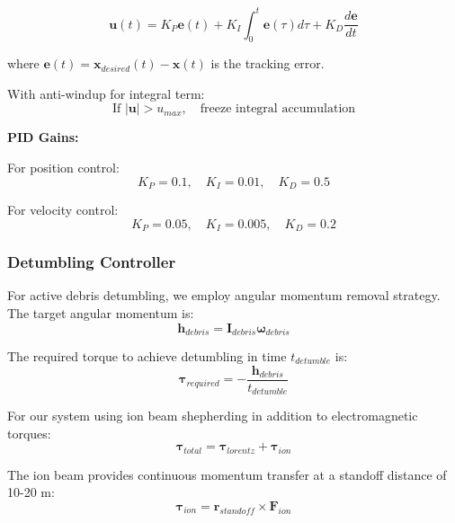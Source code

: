 \documentclass[12pt,a4paper]{article}
\begin{document}
\begin{equation}
\mathbf{u}(t) = K_P\mathbf{e}(t) + K_I\int_0^t\mathbf{e}(\tau)d\tau + K_D\frac{d\mathbf{e}}{dt}
\label{eq:pid}
\end{equation}

where $\mathbf{e}(t) = \mathbf{x}_{desired}(t) - \mathbf{x}(t)$ is the tracking error.

With anti-windup for integral term:
\begin{equation}
\text{If } |\mathbf{u}| > u_{max}, \quad \text{freeze integral accumulation}
\label{eq:anti_windup}
\end{equation}

\textbf{PID Gains:}

For position control:
\begin{equation}
K_P = 0.1, \quad K_I = 0.01, \quad K_D = 0.5
\label{eq:pid_gains_position}
\end{equation}

For velocity control:
\begin{equation}
K_P = 0.05, \quad K_I = 0.005, \quad K_D = 0.2
\label{eq:pid_gains_velocity}
\end{equation}

\subsubsection{Detumbling Controller}

For active debris detumbling, we employ angular momentum removal strategy. The target angular momentum is:
\begin{equation}
\mathbf{h}_{debris} = \mathbf{I}_{debris}\boldsymbol{\omega}_{debris}
\label{eq:angular_momentum}
\end{equation}

The required torque to achieve detumbling in time $t_{detumble}$ is:
\begin{equation}
\boldsymbol{\tau}_{required} = -\frac{\mathbf{h}_{debris}}{t_{detumble}}
\label{eq:detumble_torque}
\end{equation}

For our system using ion beam shepherding in addition to electromagnetic torques:
\begin{equation}
\boldsymbol{\tau}_{total} = \boldsymbol{\tau}_{lorentz} + \boldsymbol{\tau}_{ion}
\label{eq:combined_torque}
\end{equation}

The ion beam provides continuous momentum transfer at a standoff distance of 10-20 m:
\begin{equation}
\boldsymbol{\tau}_{ion} = \mathbf{r}_{standoff} \times \mathbf{F}_{ion}
\label{eq:ion_torque}
\end{equation}
\end{document}

